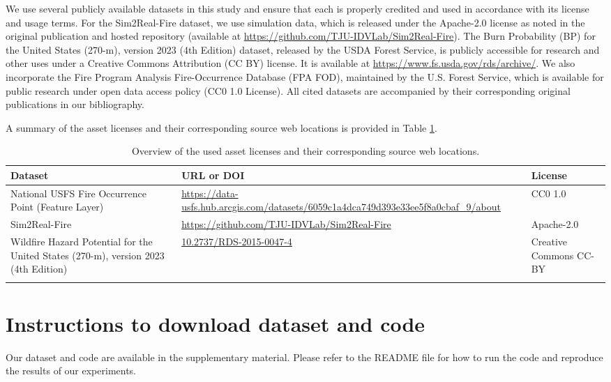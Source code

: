 \documentclass{article}
\begin{document}
We use several publicly available datasets in this study and ensure that each is properly credited and used in accordance with its license and usage terms. For the Sim2Real-Fire dataset, we use simulation data, which is released under the Apache-2.0 license as noted in the original publication and hosted repository (available at \url{https://github.com/TJU-IDVLab/Sim2Real-Fire}). The Burn Probability (BP) for the United States (270-m), version 2023 (4th Edition) dataset, released by the USDA Forest Service, is publicly accessible for research and other uses under a Creative Commons Attribution (CC BY) license. It is available at \url{https://www.fs.usda.gov/rds/archive/}. We also incorporate the Fire Program Analysis Fire-Occurrence Database (FPA FOD), maintained by the U.S. Forest Service, which is available for public research under open data access policy (CC0 1.0 License). All cited datasets are accompanied by their corresponding original publications in our bibliography. 

A summary of the asset licenses and their corresponding source web locations is provided in Table \ref{tab:assetlicenses}. 

{
\small
\begin{longtable}{p{4cm}p{6cm}p{2.5cm}}
\toprule
\textbf{Dataset} & \textbf{URL or DOI}                               & \textbf{License}   \\
\endfirsthead
%
\endhead
%
\midrule
National USFS Fire Occurrence Point (Feature Layer) &
  \url{https://data-usfs.hub.arcgis.com/datasets/6059c1a4dca749d393e33ee5f8a0cbaf_9/about} &
  CC0 1.0 \\ \midrule
Sim2Real-Fire    & \url{https://github.com/TJU-IDVLab/Sim2Real-Fire} & Apache-2.0 \\ \midrule
Wildfire Hazard Potential for the United States (270-m), version 2023 (4th Edition) &
  \url{10.2737/RDS-2015-0047-4} &
  Creative \newline Commons \newline CC-BY
  \\ \bottomrule
  \caption{Overview of the used asset licenses and their corresponding source web locations. \label{tab:assetlicenses}} \\
\end{longtable}
}

\section{Instructions to download dataset and code}\label{appendix: instructions to download dataset and code}
Our dataset and code are available in the supplementary material. Please refer to the README file for how to run the code and reproduce the results of our experiments.
\end{document}
